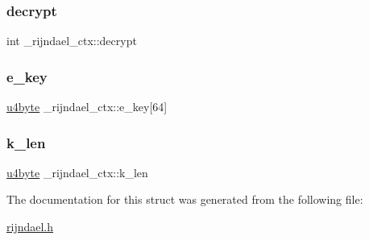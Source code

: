 \subsubsection{\texorpdfstring{decrypt}{decrypt}}
{\footnotesize\ttfamily int \+\_\+rijndael\+\_\+ctx\+::decrypt}

\mbox{\label{struct__rijndael__ctx_abc54a82997fe467b97400f22d9b4d7dc}} 
\subsubsection{\texorpdfstring{e\+\_\+key}{e\_key}}
{\footnotesize\ttfamily \mbox{\hyperlink{rijndael_8h_ac8cc4300c208ce4fbe50bd192acd6c9e}{u4byte}} \+\_\+rijndael\+\_\+ctx\+::e\+\_\+key\mbox{[}64\mbox{]}}

\mbox{\label{struct__rijndael__ctx_ac3595b891818be236ee4cbf50995b8af}} 
\subsubsection{\texorpdfstring{k\+\_\+len}{k\_len}}
{\footnotesize\ttfamily \mbox{\hyperlink{rijndael_8h_ac8cc4300c208ce4fbe50bd192acd6c9e}{u4byte}} \+\_\+rijndael\+\_\+ctx\+::k\+\_\+len}



The documentation for this struct was generated from the following file\+:\begin{DoxyCompactItemize}
\item 
\mbox{\hyperlink{rijndael_8h}{rijndael.\+h}}\end{DoxyCompactItemize}
